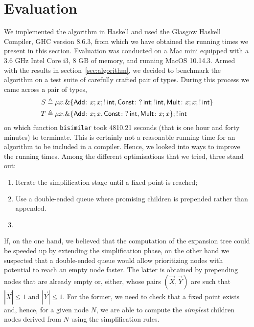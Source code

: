 \section{Evaluation}
\label{sec:evaluation}


We implemented the algorithm
in Haskell and used the Glasgow Haskell Compiler, GHC version 8.6.3,
from which we have obtained the running times we present in this
section.  Evaluation was conducted on a Mac mini equipped with a 3.6
GHz Intel Core i3, 8 GB of memory, and running MacOS 10.14.3.
%
Armed with the results in section~\ref{sec:algorithm}, we decided to
benchmark the algorithm on a test suite of carefully crafted pair of
types. During this process we came across a pair of types,
\begin{equation}
\label{ex:chaotic}
\begin{aligned}
  S &\triangleq \mu x . \&\{ \mathsf{Add}\colon x;x; !\,\mathsf{int},
  \mathsf{Const}\colon ?\,\mathsf{int};!\mathsf{int},
  \mathsf{Mult}\colon x;x;!\,\mathsf{int}\}
  \\
  T &\triangleq \mu x . \&\{ \mathsf{Add}\colon x;x,
  \mathsf{Const}\colon ?\,\mathsf{int},
  \mathsf{Mult}\colon x;x\}; !\,\mathsf{int}
\end{aligned}
\end{equation}
%
on which function \lstinline|bisimilar| took 4810.21 seconds (that is
one hour and forty minutes) to terminate. This is certainly not a
reasonable running time for an algorithm to be included in a
compiler. Hence, we looked into ways to improve the running
times. Among the different optimisations that we tried, three stand
out:
\begin{enumerate}
\item Iterate the simplification stage until a fixed point is reached;
\item Use a double-ended queue where promising children is prepended
  rather than appended.
\item {}
\end{enumerate}

If, on the one hand, we believed that the computation of the expansion
tree could be speeded up by extending the simplification phase, on the
other hand we suspected that a double-ended queue would allow
prioritizing nodes with potential to reach an empty node faster.  The
latter is obtained by prepending nodes that are already empty or,
either, whose pairs $(\vec X, \vec Y)$ are such that $|\vec X|\leq 1$
and $|\vec Y| \leq 1$.  For the former, we need to check that a fixed
point exists and, hence, for a given node $N$, we are able to compute
the \emph{simplest} children nodes derived from $N$ using the
simplification rules.


